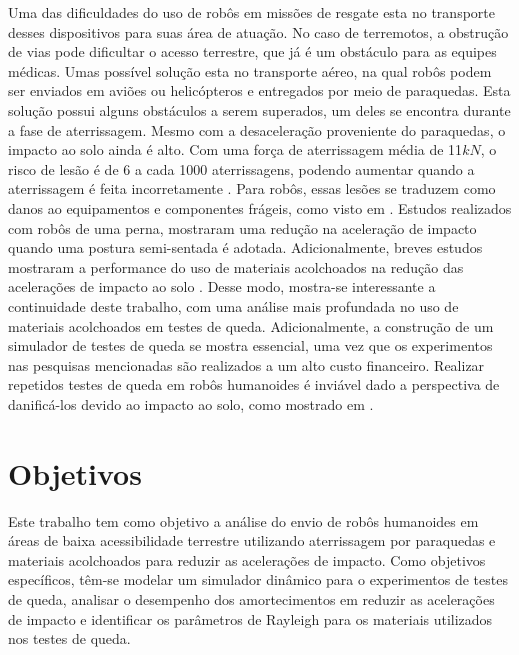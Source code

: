 Uma das dificuldades do uso de robôs em missões de resgate esta no transporte desses dispositivos para suas área de atuação. No caso de terremotos, a obstrução de vias pode dificultar o acesso terrestre, que já é um obstáculo para as equipes médicas. Umas possível solução esta no transporte aéreo, na qual robôs podem ser enviados em aviões ou helicópteros e entregados por meio de paraquedas.
Esta solução possui alguns obstáculos a serem superados, um deles se encontra durante a fase de aterrissagem. Mesmo com a desaceleração proveniente do paraquedas, o impacto ao solo ainda é alto. Com uma força de aterrissagem média de 11$kN$, o risco de lesão é de 6 a cada 1000 aterrissagens, podendo aumentar quando a aterrissagem é feita incorretamente \cite{whitting2007parachute}.
Para robôs, essas lesões se traduzem como danos ao equipamentos e componentes frágeis, como visto em \cite{tsujita2017drop}.
Estudos realizados com robôs de uma perna, mostraram uma redução na aceleração de impacto quando uma postura semi-sentada é adotada\cite{tsujita2017drop}. Adicionalmente,
breves estudos mostraram a performance do uso de materiais acolchoados na redução das acelerações de impacto ao solo \cite{tsujita2017drop} \cite{tsujita2017analysis}.
Desse modo, mostra-se interessante a continuidade deste trabalho, com uma análise mais profundada no uso de materiais acolchoados em testes de queda. Adicionalmente, a construção de um simulador de testes de queda se mostra essencial, uma vez que os experimentos nas pesquisas mencionadas são realizados a um alto custo financeiro. Realizar repetidos testes de queda em robôs humanoides é inviável dado a perspectiva de danificá-los devido ao impacto ao solo, como mostrado em \cite{tsujita2017drop}.






\section{Objetivos}

Este trabalho tem como objetivo a análise do envio de robôs humanoides em áreas de baixa acessibilidade terrestre utilizando aterrissagem por paraquedas e materiais acolchoados para reduzir as acelerações de impacto.
Como objetivos específicos, têm-se modelar um simulador dinâmico para o experimentos de testes de queda, analisar o desempenho dos amortecimentos em reduzir as acelerações de impacto e identificar os parâmetros de Rayleigh para os materiais utilizados nos testes de queda.

